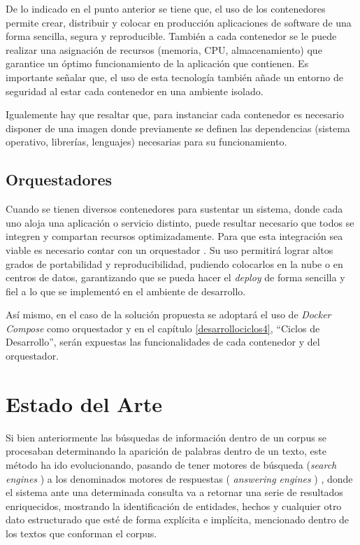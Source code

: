 \documentclass[
  12pt,
  openany]{book}
\begin{document}
De lo indicado en el punto anterior se tiene que, el uso de los contenedores permite crear, distribuir y colocar en producción aplicaciones de software de una forma sencilla, segura y reproducible. También a cada contenedor se le puede realizar una asignación de recursos (memoria, CPU, almacenamiento) que garantice un óptimo funcionamiento de la aplicación que contienen. Es importante señalar que, el uso de esta tecnología también añade un entorno de seguridad al estar cada contenedor en una ambiente isolado.

Igualemente hay que resaltar que, para instanciar cada contenedor es necesario disponer de una imagen donde previamente se definen las dependencias (sistema operativo, librerías, lenguajes) necesarias para su funcionamiento.

\hypertarget{orquestador}{%
\subsection{Orquestadores}\label{orquestador}}

Cuando se tienen diversos contenedores para sustentar un sistema, donde cada uno aloja una aplicación o servicio distinto, puede resultar necesario que todos se integren y compartan recursos optimizadamente. Para que esta integración sea viable es necesario contar con un orquestador \citep{cook2017}. Su uso permitirá lograr altos grados de portabilidad y reproducibilidad, pudiendo colocarlos en la nube o en centros de datos, garantizando que se pueda hacer el \emph{deploy} de forma sencilla y fiel a lo que se implementó en el ambiente de desarrollo.

Así mismo, en el caso de la solución propuesta se adoptará el uso de \emph{Docker Compose} como orquestador y en el capítulo \ref{desarrollociclos4}, ``Ciclos de Desarrollo'', serán expuestas las funcionalidades de cada contenedor y del orquestador.

\hypertarget{sota}{%
\section{Estado del Arte}\label{sota}}

Si bien anteriormente las búsquedas de información dentro de un corpus se procesaban determinando la aparición de palabras dentro de un texto, este método ha ido evolucionando, pasando de tener motores de búsqueda (\emph{search engines} ) a los denominados motores de respuestas ( \emph{answering engines} ) \citep{balog2018}, donde el sistema ante una determinada consulta va a retornar una serie de resultados enriquecidos, mostrando la identificación de entidades, hechos y cualquier otro dato estructurado que esté de forma explícita e implícita, mencionado dentro de los textos que conforman el corpus.
\end{document}
